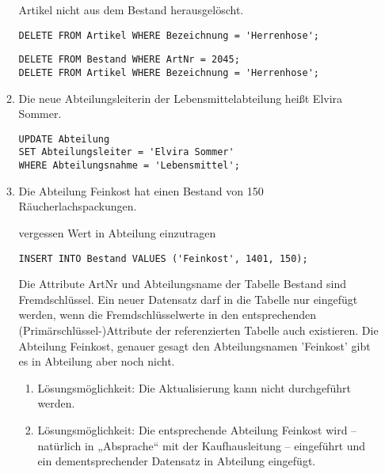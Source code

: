 \documentclass{lehramt-informatik-haupt}
\begin{document}
\begin{enumerate}
\begin{enumerate}
\begin{antwort}[falsch]
Artikel nicht aus dem Bestand herausgelöscht.
\begin{verbatim}
DELETE FROM Artikel WHERE Bezeichnung = 'Herrenhose';
\end{verbatim}
\end{antwort}

\begin{antwort}[muster]
\begin{verbatim}
DELETE FROM Bestand WHERE ArtNr = 2045;
DELETE FROM Artikel WHERE Bezeichnung = 'Herrenhose';
\end{verbatim}
\end{antwort}


\item Die neue Abteilungsleiterin der Lebensmittelabteilung heißt Elvira
Sommer.

\begin{antwort}[muster]
\begin{verbatim}
UPDATE Abteilung
SET Abteilungsleiter = 'Elvira Sommer'
WHERE Abteilungsnahme = 'Lebensmittel';
\end{verbatim}
\end{antwort}


\item Die Abteilung Feinkost hat einen Bestand von 150
Räucherlachspackungen.

\begin{antwort}[falsch]
vergessen Wert in Abteilung einzutragen
\begin{verbatim}
INSERT INTO Bestand VALUES ('Feinkost', 1401, 150);
\end{verbatim}
\end{antwort}

\begin{antwort}[muster]
Die Attribute ArtNr und Abteilungsname der Tabelle
Bestand sind Fremdschlüssel. Ein neuer Datensatz darf in die Tabelle nur
eingefügt werden, wenn die Fremdschlüsselwerte in den entsprechenden
(Primärschlüssel-)Attribute der referenzierten Tabelle auch existieren.
Die Abteilung Feinkost, genauer gesagt den Abteilungsnamen ’Feinkost’
gibt es in Abteilung aber noch nicht.

\begin{enumerate}
\item Lösungsmöglichkeit: Die Aktualisierung kann nicht durchgeführt
werden.

\item Lösungsmöglichkeit: Die entsprechende Abteilung Feinkost wird –
natürlich in „Absprache“ mit der Kaufhausleitung – eingeführt und ein
dementsprechender Datensatz in Abteilung eingefügt.
\end{enumerate}


\end{antwort}
\end{enumerate}
\end{enumerate}
\end{document}
